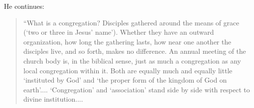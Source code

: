 He continues:

\begin{quote}
“What is a congregation? Disciples gathered around the means of grace (‘two or three in Jesus’ name’). Whether they have an outward organization, how long the gathering lasts, how near one another the disciples live, and so forth, makes no difference. An annual meeting of the church body is, in the biblical sense, just as much a congregation as any local congregation within it. Both are equally much and equally little ‘instituted by God’ and ‘the proper form of the kingdom of God on earth’.... ‘Congregation’ and ‘association’ stand side by side with respect to divine institution....
\end{quote}
